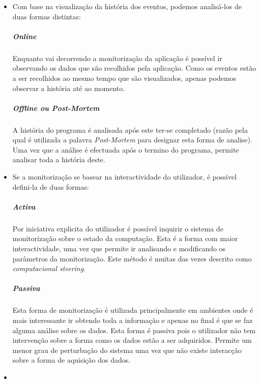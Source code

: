 \begin{itemize}
 \item 


Com base na visualização da história dos eventos, podemos analisá-los de duas formas distintas:
\subparagraph*{Online}
Enquanto vai decorrendo a monitorização da aplicação é possível ir observando os dados que são recolhidos pela aplicação. Como os eventos estão a ser recolhidos ao mesmo tempo que são visualizados, apenas podemos observar a história até ao momento.

\subparagraph*{Offline ou \textit{Post-Mortem}}
A história do programa é analisada após este ter-se completado (razão pela qual é utilizada a palavra \textit{Post-Mortem} para designar esta forma de analise). Uma vez que a análise é efectuada após o termino do programa, permite analisar toda a história deste.

\item

Se a monitorização se basear na interactividade do utilizador, é possível defini-la de duas formas:

\subparagraph*{Activa}

Por iniciativa explicita do utilizador é possível inquirir o sistema de monitorização sobre o estado da computação. Esta é a forma com maior interactividade, uma vez que permite ir analisando e modificando os parâmetros da monitorização. Este método é muitas das vezes descrito como \textit{computacional steering}.


\subparagraph*{Passiva}
Esta forma de monitorização é utilizada principalmente em ambientes onde é mais interessante ir obtendo toda a informação e apenas no final é que se faz alguma análise sobre os dados. Esta forma é passiva pois o utilizador não tem intervenção sobre a forma como os dados estão a ser adquiridos. Permite um menor grau de perturbação do sistema uma vez que não existe interacção sobre a forma de aquisição dos dados. 
\item


\end{itemize}
